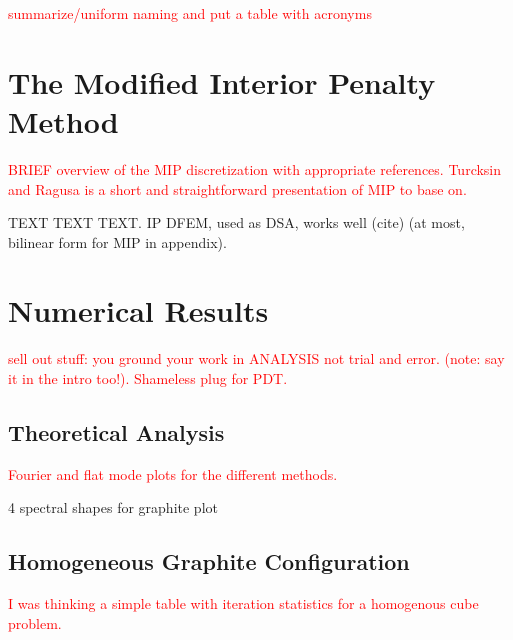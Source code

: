 \documentclass[preprint,10pt]{elsarticle}
\newcommand{\tcr}[1]{\textcolor{red}{#1}}
\begin{document}
\tcr{summarize/uniform naming and put a table with acronyms}

\section{The Modified Interior Penalty Method} \label{sec::MIP}

\tcr{BRIEF overview of the MIP discretization with appropriate references. Turcksin and Ragusa is a short and straightforward presentation of MIP to base on.}

TEXT TEXT TEXT. IP DFEM, used as DSA, works well (cite) (at most, bilinear form for MIP in appendix).

\section{Numerical Results} \label{sec::results}
\tcr{sell out stuff: you ground your work in ANALYSIS not trial and error. (note: say it in the intro too!). Shameless plug for PDT.}

\subsection{Theoretical Analysis}
\tcr{Fourier and flat mode plots for the different methods.}


4 spectral shapes for graphite plot

\subsection{Homogeneous Graphite Configuration}
\tcr{I was thinking a simple table with iteration statistics for a homogenous cube problem.}
\end{document}
